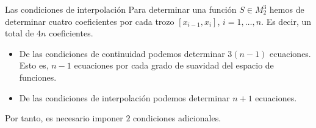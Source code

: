 \begin{frame}{Las condiciones de interpolación}
    Para determinar una función $S \in M_2^3$ hemos de determinar cuatro
    coeficientes por cada trozo $[x_{i-1}, x_i]$, $i = 1, \dots, n$. Es
    decir, un total de $4n$ coeficientes.

    \pause

    \begin{itemize}[<+->]
        \item De las condiciones de continuidad podemos determinar $3(n-1)$
        ecuaciones. Esto es, $n - 1$ ecuaciones por cada grado de suavidad
        del espacio de funciones.
        \item De las condiciones de interpolación podemos determinar $n + 1
        $ ecuaciones.
    \end{itemize}

    Por tanto, es necesario imponer \alert{$2$ condiciones adicionales}.
\end{frame}
